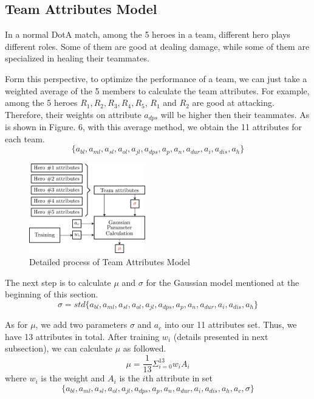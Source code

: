 \documentclass[letterpaper, 10 pt, conference]{ieeeconf}  %
\begin{document}
\subsection{Team Attributes Model}

In a normal DotA match, among the 5 heroes in a team, different hero plays different roles. Some of them are good at dealing damage, while some of them are specialized in healing their teammates. 

Form this perspective, to optimize the performance of a team, we can just take a weighted average of the 5 members to calculate the team attributes. For example, among the 5 heroes $R_1, R_2, R_3, R_4, R_5$, $R_1$ and $R_2$ are good at attacking. Therefore, their weights on attribute $a_{dps}$ will be higher then their teammates. As is shown in Figure. 6, with this average method, we obtain the 11 attributes for each team. 
$$\{a_{bl}, a_{ml}, a_{sl}, a_{ol}, a_{jl}, a_{dps}, a_{p}, a_{n}, a_{dur}, a_{i}, a_{dis}, a_{h}\}$$

\begin{figure}[H]
\begin{center}
\includegraphics[width=0.45\textwidth]{team_attribute.png}
\caption{Detailed process of Team Attributes Model}
\end{center}
\end{figure}

The next step is to calculate $\mu$ and $\sigma$ for the Gaussian model mentioned at the beginning of this section. 
$$\sigma = std\{a_{bl}, a_{ml}, a_{sl}, a_{ol}, a_{jl}, a_{dps}, a_{p}, a_{n}, a_{dur}, a_{i}, a_{dis}, a_{h}\}$$

As for $\mu$, we add two parameters $\sigma$ and $a_c$ into our 11 attributes set. Thus, we have 13 attributes in total. After training $w_i$ (details presented in next subsection), we can calculate $\mu$ as followed. 
$$\mu = \frac{1}{13}\Sigma_{i = 0}^{13}w_i A_i$$
where $w_i$ is the weight and $A_i$ is the $i$th attribute in set 
$$\{a_{bl}, a_{ml}, a_{sl}, a_{ol}, a_{jl}, a_{dps}, a_{p}, a_{n}, a_{dur}, a_{i}, a_{dis}, a_{h}, a_c, \sigma\}$$
\end{document}
